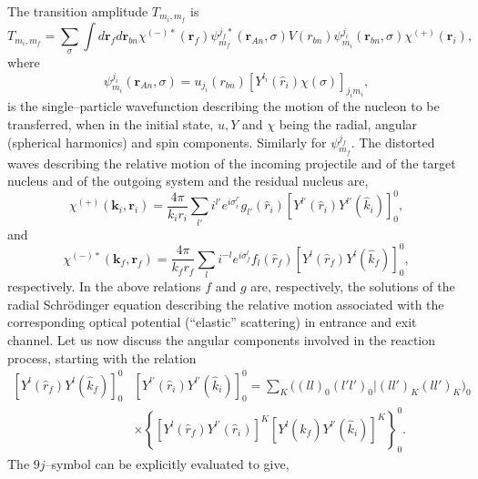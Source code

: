 The transition amplitude $T_{m_i,m_f}$ is
\begin{equation}\label{eq_onept5}
T_{m_i,m_f}=\sum_\sigma\int d\mathbf{r}_fd\mathbf{r}_{bn}\chi^{(-)*}(\mathbf{r}_f)
\psi_{m_f}^{j_f*}(\mathbf{r}_{An},\sigma)V(r_{bn})\psi_{m_i}^{j_i}(\mathbf{r}_{bn},\sigma)\chi^{(+)}(\mathbf{r}_i),
\end{equation}
where
\begin{equation}\label{eq_onept12}
\psi_{m_i}^{j_i}(\mathbf{r}_{An},\sigma)=u_{j_i}(r_{bn})\left[ Y^{l_i} (\hat r_i)\chi(\sigma)\right]_{j_i m_i},
\end{equation}
is the single--particle wavefunction describing the motion of the nucleon  to be transferred, when in the initial state, $u,Y$ and $\chi$ being the radial, angular (spherical harmonics) and spin components. Similarly for $\psi_{m_f}^{j_f}$. 
The distorted waves describing the relative motion of the incoming projectile and of the target nucleus and of the outgoing system and the residual nucleus are,
 \begin{equation}\label{eq_onept6}
\chi^{(+)}(\mathbf{k}_i,\mathbf{r}_i)= \frac{ 4\pi }{k_i r_i}\sum_{l'} i^{l'}
e^{i\sigma_i^{l'}} g_{l'}(\hat r_i) \left[ Y^{l'} (\hat r_i) Y^{l'} (\hat k_i)\right]^0_0,
\end{equation}
and
 \begin{equation}\label{eq_onept7}
\chi^{(-)*}(\mathbf{k}_f,\mathbf{r}_f)= \frac{ 4\pi }{k_f r_f}\sum_{l} i^{-l}
e^{i\sigma_f^{l}} f_{l}  (\hat r_f) \left[ Y^{l} (\hat r_f) Y^{l} (\hat k_f)\right]^0_0,
\end{equation}
respectively. In the above relations $f$ and $g$ are, respectively, the solutions of the radial Schr\"odinger equation  describing the relative motion  associated with the corresponding optical potential  (``elastic'' scattering) in entrance and exit channel. Let us now discuss the angular components involved in the reaction process, starting with the relation
\begin{equation}\label{eq_onept8}
    \begin{split}
\left[ Y^{l} (\hat r_f) Y^{l} (\hat k_f)\right]^0_0&\left[ Y^{l'} (\hat r_i) Y^{l'} (\hat k_i)\right]^0_0=\sum_K \bigl((l l)_0(l' l')_0|(l l')_K(l l')_K\bigr)_0\\
&\times \left\{\left[ Y^{l} (\hat r_f) Y^{l'} (\hat r_i)\right]^K\left[ Y^{l} (\hat k_f) Y^{l'} (\hat k_i)\right]^K\right\}^0_0.
    \end{split}
\end{equation}
The $9j$--symbol can be explicitly evaluated to give,
